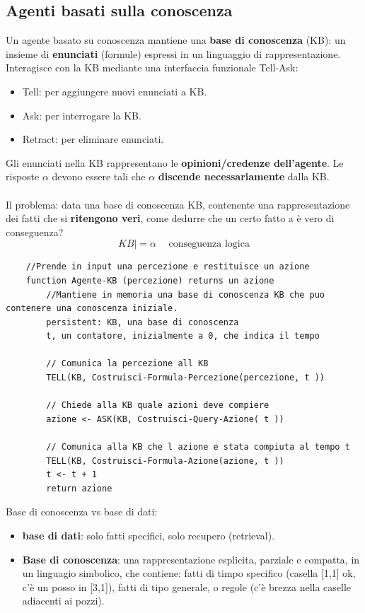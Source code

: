 \subsection{Agenti basati sulla conoscenza}
Un agente basato su conoscenza mantiene una \textbf{base di conoscenza} (KB): un insieme di \textbf{enunciati} (formule) espressi in un
linguaggio di rappresentazione. Interagisce con la KB mediante una interfaccia funzionale Tell-Ask:
\begin{itemize}
    \item Tell: per aggiungere nuovi enunciati a KB.
    \item Ask: per interrogare la KB.
    \item Retract: per eliminare enunciati.
\end{itemize}
Gli enunciati nella KB rappresentano le \textbf{opinioni/credenze dell’agente}. Le risposte $\alpha$ devono
essere tali che $\alpha$ \textbf{discende necessariamente} dalla KB.\\\\
Il problema: data una base di conoscenza KB, contenente una rappresentazione dei fatti che si
\textbf{ritengono veri}, come dedurre che un certo fatto a è vero di conseguenza?
$$KB |= \alpha \hspace{15pt}\text{conseguenza logica}$$
\begin{lstlisting}
    //Prende in input una percezione e restituisce un azione
    function Agente-KB (percezione) returns un azione
        //Mantiene in memoria una base di conoscenza KB che puo contenere una conoscenza iniziale.
        persistent: KB, una base di conoscenza
        t, un contatore, inizialmente a 0, che indica il tempo

        // Comunica la percezione all KB
        TELL(KB, Costruisci-Formula-Percezione(percezione, t ))

        // Chiede alla KB quale azioni deve compiere
        azione <- ASK(KB, Costruisci-Query-Azione( t ))

        // Comunica alla KB che l azione e stata compiuta al tempo t
        TELL(KB, Costruisci-Formula-Azione(azione, t ))
        t <- t + 1
        return azione
\end{lstlisting}
Base di conoscenza vs base di dati:
\begin{itemize}
    \item \textbf{base di dati}: solo fatti specifici, solo recupero (retrieval).
    \item \textbf{Base di conoscenza}: una rappresentazione esplicita, parziale e compatta, in un linguagio simbolico, che contiene:
    fatti di timpo specifico (casella [1,1] ok, c'è un posso in [3,1]), fatti di tipo generale, o regole (c'è brezza nella caselle adiacenti ai pozzi).
\end{itemize}
